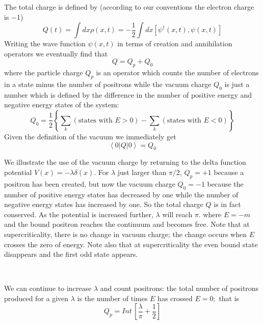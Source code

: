 \noindent The total charge is defined by (according to our conventions the
electron charge is $-$1)\ 
\begin{equation}
Q(t)=\int dx\rho (x,t)=-\frac 12\int dx\left[ \psi ^{\dagger }(x,t),\psi
(x,t)\right]  \label{ch1}
\end{equation}
Writing the wave function $\psi (x,t)$ in terms of creation and annihilation
operators we eventually find that 
\begin{equation}
Q=Q_p+Q_0  \label{ch}
\end{equation}
where the particle charge $Q_p$ is an operator which counts the number of
electrons in a state minus the number of positrons while the vacuum charge $%
Q_0$ is just a number which is defined by the difference in the number of
positive energy and negative energy states of the system: 
\begin{equation}
Q_0=\frac 12\left\{ \sum_k(\text{states with }E>0)-\sum_k(\text{states with }%
E<0)\right\}  \label{qo}
\end{equation}
\noindent Given the definition of the vacuum we immediately get 
\begin{equation}
\left\langle 0\right| Q\left| 0\right\rangle =Q_0  \label{vgch}
\end{equation}

\noindent We illustrate the use of the vacuum charge by returning to the
delta function potential $V(x)=-\lambda \delta (x)$. For $\lambda $ just
larger than $\pi /2$, $Q_p=+1$ because a positron has been created, but now
the vacuum charge $Q_0=-1$ because the number of positive energy states has
decreased by one while the number of negative energy states has increased by
one. So the total charge $Q$ is in fact conserved. As the potential is
increased further, $\lambda $ will reach $\pi .$ where $E=-m$ and the bound
positron reaches the continuum and becomes free. Note that at
supercriticality, there is no change in vacuum charge; the change occurs
when $E$ crosses the zero of energy. Note also that at supercriticality the
even bound state disappears and the first odd state appears.

\smallskip\ 

\noindent We can continue to increase $\lambda $ and count positrons: the
total number of positrons produced for a given $\lambda $ is the number of
times $E$ has crossed $E=0;$ that is 
\begin{equation}
Q_p=Int\,[\frac \lambda \pi +\frac 12]  \label{charge0}
\end{equation}

